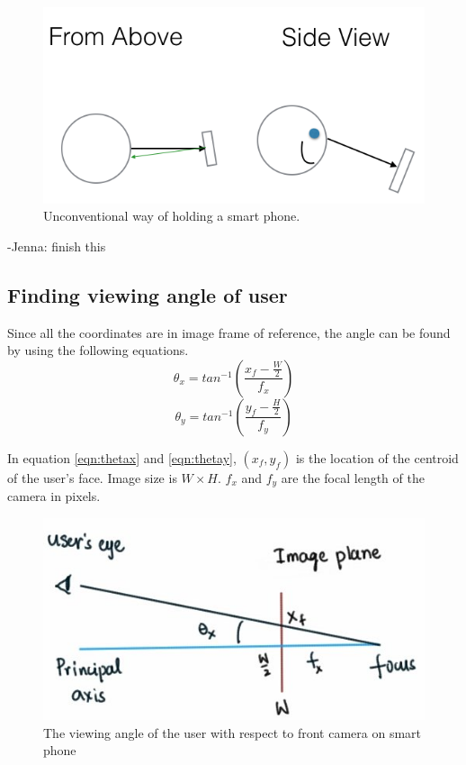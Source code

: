 \documentclass[12pt,twocolumn,letterpaper]{article}
\begin{document}
\begin{figure}[!htbp]
\centering
\includegraphics[height=30 mm]{unconventional.png}
\caption{Unconventional way of holding a smart phone.}
\label{fig:unconventional}
\end{figure}

     -Jenna: finish this

\subsection{Finding viewing angle of user}
Since all the coordinates are in image frame of reference, the angle can be found by using the following equations. 
\begin{equation}
\theta_x = tan^{-1} \left( \frac{x_f - \frac{W}{2}}{f_x} \right)
\label{eqn:thetax}
\end{equation}
\begin{equation}
\theta_y = tan^{-1} \left( \frac{y_f - \frac{H}{2}}{f_y} \right)
\label{eqn:thetay}
\end{equation}

In equation \ref{eqn:thetax} and \ref{eqn:thetay}, $(x_f, y_f)$ is the location of the centroid of the user's face. Image size is $W \times H$. $f_x$ and $f_y$ are the focal length of the camera in pixels.

\begin{figure}[!htbp]
\includegraphics[scale=0.5]{view_angle}
\caption{The viewing angle of the user with respect to front camera on smart phone}
\label{fig:viewangle}
\end{figure}
\end{document}
